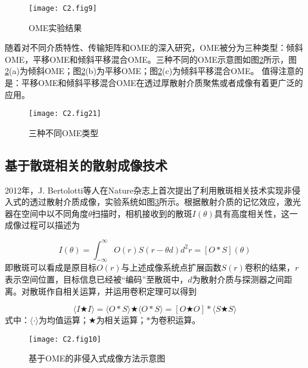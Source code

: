 \begin{figure}[htp]
	\centering
	\texttt{[image: C2.fig9]}
	\caption{OME实验结果}
	\label{fig2:9}
\end{figure}

随着对不同介质特性、传输矩阵和OME的深入研究，OME被分为三种类型：倾斜OME，平移OME和倾斜平移混合OME\cite{osnabrugge_generalized_2017}。三种不同的OME示意图如图\ref{fig2:21}所示，图\ref{fig2:21}(a)为倾斜OME\cite{Freund1988}；图\ref{fig2:21}(b)为平移OME\cite{judkewitz_translation_2015}；图\ref{fig2:21}(c)为倾斜平移混合OME\cite{osnabrugge_generalized_2017}。
值得注意的是：平移OME和倾斜平移混合OME在透过厚散射介质聚焦或者成像有着更广泛的应用。

\begin{figure}[htp]
	\centering
	\texttt{[image: C2.fig21]}
	\caption{三种不同OME类型}
	\label{fig2:21}
\end{figure}

\subsection{基于散斑相关的散射成像技术}

2012年，J. Bertolotti等人\cite{bertolotti_non-invasive_2012}在Nature杂志上首次提出了利用散斑相关技术实现非侵入式的透过散射介质成像，实验系统如图\ref{fig2:10}所示\cite{bertolotti_non-invasive_2012}。根据散射介质的记忆效应，激光器在空间中以不同角度$\theta$扫描时，相机接收到的散斑$I(\theta)$具有高度相关性，这一成像过程可以描述为

\begin{equation}
  I(\theta)= \int_{-\infty}^{\infty} O(r)S(r-\theta d) d^2 r = [O*S](\theta)
\label{eq:2.4}
\end{equation}
即散斑可以看成是原目标$O(r)$与上述成像系统点扩展函数$S(r)$卷积的结果，$r$表示空间位置，目标信息已经被“编码”至散斑中，$d$为散射介质与探测器之间距离。对散斑作自相关运算，并运用卷积定理可以得到

\begin{equation}
  \langle I\bigstar I \rangle = \langle O*S \rangle \bigstar \langle O*S \rangle = [O \bigstar O] * \langle S\bigstar S \rangle
\label{eq:2.5}
\end{equation}
式中：$\langle \cdot \rangle$为均值运算；$\bigstar$为相关运算；$*$为卷积运算。

\begin{figure}[htp]
	\centering
	\texttt{[image: C2.fig10]}
	\caption{基于OME的非侵入式成像方法示意图}
	\label{fig2:10}
\end{figure}

